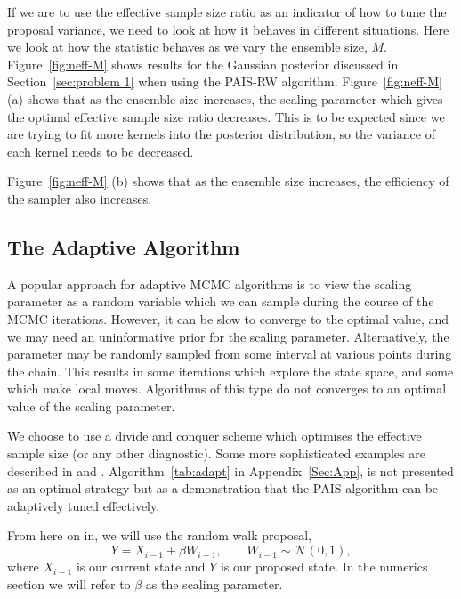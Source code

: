 \documentclass[final]{siamltex}
\begin{document}
If we are to use the effective sample size ratio as an indicator of
how to tune the proposal variance, we need to look at how it behaves
in different situations. Here we look at how the statistic behaves as we vary the ensemble size, $M$. Figure~\ref{fig:neff-M} shows results for the Gaussian posterior discussed in Section~\ref{sec:problem 1} when using the PAIS-RW algorithm. Figure~\ref{fig:neff-M} (a) shows that as the ensemble size increases, the scaling parameter which gives the optimal effective sample size ratio decreases. This is to be expected since we are trying to fit more kernels into the posterior distribution, so the variance of each kernel needs to be decreased.

Figure~\ref{fig:neff-M} (b) shows that as the ensemble size increases, the efficiency of the sampler also increases.

\subsection{The Adaptive Algorithm}\label{sec:adapt}

A popular approach for adaptive MCMC algorithms is to view the scaling
parameter as a random variable which we can sample during the course
of the MCMC iterations. However, it can be slow to converge to the
optimal value, and we may need an
uninformative prior for the scaling parameter. Alternatively, the parameter may be randomly sampled from some interval at various points during the chain. This results in some iterations which explore the state space, and some which make local moves. Algorithms of this type do not converges to an optimal value of the scaling parameter.

We choose to use a divide and conquer scheme which optimises the effective sample size (or any other diagnostic). Some more sophisticated examples are described in \cite{roberts2009examples} and \cite{Ji2013adaptive}. Algorithm~\ref{tab:adapt} in Appendix~\ref{Sec:App}, is not presented as an optimal strategy but as a demonstration that the PAIS algorithm can be adaptively tuned effectively.

From here on in, we will use the random walk proposal,
\begin{equation}Y = X_{i-1}+\beta W_{i-1}, \qquad W_{i-1} \sim \mathcal{N}(0,1),
\end{equation}
where $X_{i-1}$ is our current state and $Y$ is our proposed state. In the numerics section we will refer to $\beta$ as the scaling parameter.
\end{document}
